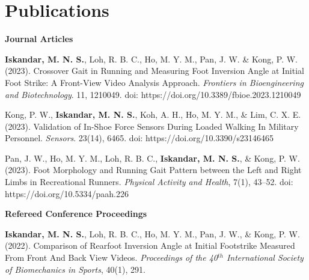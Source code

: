 \documentclass[../main.tex]{subfiles}
\begin{document}
\section{Publications} 
  \vspace{2pt}
  \resumeSubHeadingListStart
    \item
        \textbf{Journal Articles} 
        \def\labelprefix{J}
        \begin{etaremune}
            \item\label{article: frontiers foot inversion} {\textbf{Iskandar, M. N. S.}, Loh, R. B. C., Ho, M. Y. M., Pan, J. W. \& Kong, P. W. (2023). Crossover Gait in Running and Measuring Foot Inversion Angle at Initial Foot Strike: A Front-View Video Analysis Approach. \textit{Frontiers in Bioengineering and Biotechnology}. 11, 1210049. doi: https://doi.org/10.3389/fbioe.2023.1210049 \href{https://doi.org/10.3389/fbioe.2023.1210049}{\faFilePdfO}} %
            
            \item\label{article: sensors validation exoskeletal} {Kong, P. W., \textbf{Iskandar, M. N. S.}, Koh, A. H., Ho, M. Y. M., \& Lim, C. X. E. (2023). Validation of In-Shoe Force Sensors During Loaded Walking In Military Personnel. \textit{Sensors}. 23(14), 6465. doi: https://doi.org/10.3390/s23146465 \href{https://doi.org/10.3390/s23146465}{\faFilePdfO}} %
            
            \item\label{article: paah foot morphology} {Pan, J. W., Ho, M. Y. M., Loh, R. B. C., \textbf{Iskandar, M. N. S.}, \& Kong, P. W. (2023). Foot Morphology and Running Gait Pattern between the Left and Right Limbs in Recreational Runners. \textit{Physical Activity and Health}, 7(1), 43–52. doi: https://doi.org/10.5334/paah.226 \href{https://doi.org/10.5334/paah.226}{\faFilePdfO}} %
        \end{etaremune}
                
        \textbf{Refereed Conference Proceedings}
        \def\labelprefix{C}
        \begin{etaremune}
            \item\label{conference: isbs2022} {\textbf{Iskandar, M. N. S.}, Loh, R. B. C., Ho, M. Y. M., Pan, J. W., \& Kong, P. W. (2022). Comparison of Rearfoot Inversion Angle at Initial Footstrike Measured From Front And Back View Videos. \textit{Proceedings of the 40$^{th}$ International Society of Biomechanics in Sports}, 40(1), 291. \href{https://commons.nmu.edu/isbs/vol40/iss1/70/}{\faFilePdfO}}
        \end{etaremune}
\end{document}
